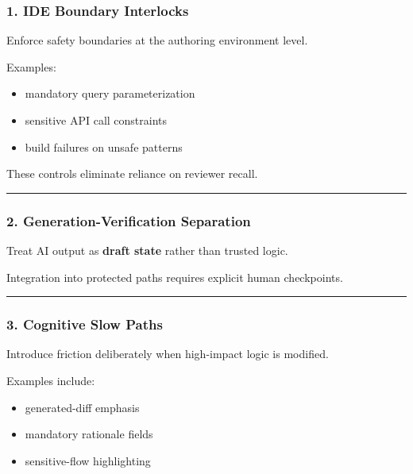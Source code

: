 \documentclass[
]{article}
\providecommand{\tightlist}{%
  \setlength{\itemsep}{0pt}\setlength{\parskip}{0pt}}
\begin{document}
\subsubsection{1. IDE Boundary
Interlocks}\label{1-ide-boundary-interlocks}

Enforce safety boundaries at the authoring environment level.

Examples:

\begin{itemize}
\tightlist
\item
  mandatory query parameterization
\item
  sensitive API call constraints
\item
  build failures on unsafe patterns
\end{itemize}

These controls eliminate reliance on reviewer recall.

\begin{center}\rule{0.5\linewidth}{0.5pt}\end{center}

\subsubsection{2. Generation-Verification
Separation}\label{2-generation-verification-separation}

Treat AI output as \textbf{draft state} rather than trusted logic.

Integration into protected paths requires explicit human checkpoints.

\begin{center}\rule{0.5\linewidth}{0.5pt}\end{center}

\subsubsection{3. Cognitive Slow Paths}\label{3-cognitive-slow-paths}

Introduce friction deliberately when high-impact logic is modified.

Examples include:

\begin{itemize}
\tightlist
\item
  generated-diff emphasis
\item
  mandatory rationale fields
\item
  sensitive-flow highlighting
\end{itemize}
\end{document}
